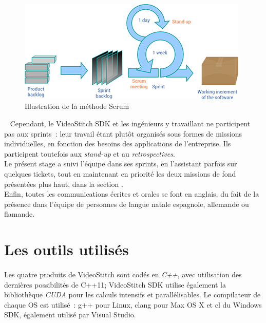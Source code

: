 \begin{figure}
  \centering
  \includegraphics[width=11cm]{images/scrum-process.png}
  \caption{Illustration de la méthode Scrum\cite{scrum-process}}
\end{figure}
\ \newline
Cependant, le VideoStitch SDK et les ingénieurs y travaillant ne participent pas
aux sprints~: leur travail étant plutôt organisés sous formes de missions individuelles,
en fonction des besoins des applications de l'entreprise. Ils participent toutefois 
aux \textit{stand-up} et au \textit{retrospectives}.\\
Le présent stage a suivi l'équipe dans ses sprints, en l'assistant parfois sur quelques
tickets, tout en maintenant en priorité les deux missions de fond présentées plus haut, dans 
la section .\\
\newline
Enfin, toutes les communications écrites et orales se font en anglais, du fait
de la présence dans l'équipe de personnes de langue natale espagnole, allemande ou flamande.

\section{Les outils utilisés}
\label{outils-utilisés}
\paragraph{}
Les quatre produits de VideoStitch sont codés en \emph{C++}, avec utilisation des dernières possibilités
de C++11; VideoStitch SDK utilise également la bibliothèque \emph{CUDA} pour les calculs intensifs et parallélisables.
Le compilateur de chaque OS est utilisé~: g++ pour Linux, clang pour Max OS X et 
cl du Windows SDK, également utilisé par Visual Studio.
